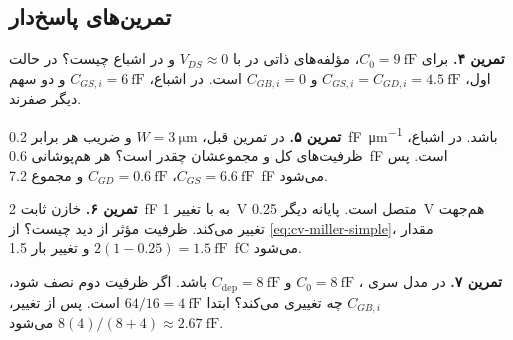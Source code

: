 \subsection{تمرین‌های پاسخ‌دار }
\textbf{تمرین ۴.} برای \(C_0=\qty{9}{\femto\farad}\)، مؤلفه‌های ذاتی در
 با \(V_{DS}\approx0\) و در اشباع چیست؟ در حالت اول،
\(C_{GS,i}=C_{GD,i}=\qty{4.5}{\femto\farad}\) و \(C_{GB,i}=0\) است.
در اشباع، \(C_{GS,i}=\qty{6}{\femto\farad}\) و دو سهم دیگر صفرند.

\textbf{تمرین ۵.} در تمرین قبل، \(W=\qty{3}{\micro\metre}\) و ضریب هر
 برابر \qty{0.2}{\femto\farad\per\micro\metre} باشد.
در اشباع، ظرفیت‌های کل و مجموعشان چقدر است؟ هر هم‌پوشانی
\qty{0.6}{\femto\farad} است. پس \(C_{GS}=\qty{6.6}{\femto\farad}\)،
\(C_{GD}=\qty{0.6}{\femto\farad}\) و مجموع \qty{7.2}{\femto\farad} می‌شود.

\textbf{تمرین ۶.} خازن ثابت \qty{2}{\femto\farad} به  با تغییر
\qty{1}{\volt} متصل است. پایانه دیگر \qty{0.25}{\volt} هم‌جهت تغییر می‌کند.
ظرفیت مؤثر از دید  چیست؟ از \eqref{eq:cv-miller-simple}، مقدار
\(2(1-0.25)=\qty{1.5}{\femto\farad}\) و تغییر بار
\qty{1.5}{\femto\coulomb} می‌شود.

\textbf{تمرین ۷.} در مدل سری ، \(C_0=\qty{8}{\femto\farad}\)
و \(C_{\mathrm{dep}}=\qty{8}{\femto\farad}\) باشد. اگر ظرفیت دوم نصف شود،
\(C_{GB,i}\) چه تغییری می‌کند؟ ابتدا \(64/16=\qty{4}{\femto\farad}\) است.
پس از تغییر، \(8(4)/(8+4)\approx\qty{2.67}{\femto\farad}\) می‌شود.
\clearpage

